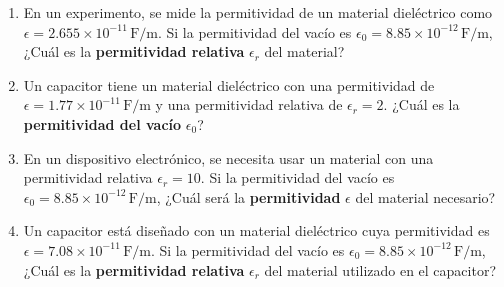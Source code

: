 \documentclass[../main]{subfiles}
\begin{document}
\begin{enumerate}
    \item En un experimento, se mide la permitividad de un material dieléctrico como $\epsilon = 2.655 \times 10^{-11} \, \text{F/m}$. Si la permitividad del vacío es $\epsilon_0 = 8.85 \times 10^{-12} \, \text{F/m}$, ¿Cuál es la \textbf{permitividad relativa} $\epsilon_r$ del material?

    \item Un capacitor tiene un material dieléctrico con una permitividad de $\epsilon = 1.77 \times 10^{-11} \, \text{F/m}$ y una permitividad relativa de $\epsilon_r = 2$. ¿Cuál es la \textbf{permitividad del vacío} $\epsilon_0$?

    \item En un dispositivo electrónico, se necesita usar un material con una permitividad relativa $\epsilon_r = 10$. Si la permitividad del vacío es $\epsilon_0 = 8.85 \times 10^{-12} \, \text{F/m}$, ¿Cuál será la \textbf{permitividad} $\epsilon$ del material necesario?

    \item Un capacitor está diseñado con un material dieléctrico cuya permitividad es $\epsilon = 7.08 \times 10^{-11} \, \text{F/m}$. Si la permitividad del vacío es $\epsilon_0 = 8.85 \times 10^{-12} \, \text{F/m}$, ¿Cuál es la \textbf{permitividad relativa} $\epsilon_r$ del material utilizado en el capacitor?

\end{enumerate}
\end{document}
